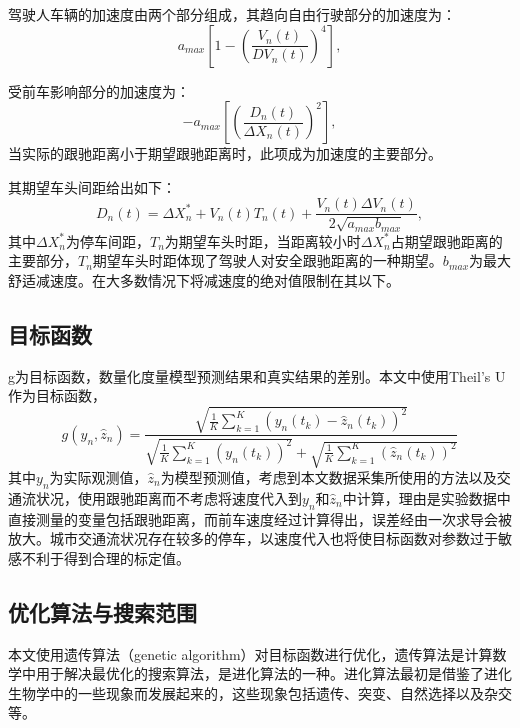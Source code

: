 %

驾驶人车辆的加速度由两个部分组成，其趋向自由行驶部分的加速度为：
\begin{equation}
a_{max}\left[1-\left(\frac{V_n(t)}{DV_n(t)}\right)^4\right],
\end{equation}

受前车影响部分的加速度为：
\begin{equation}
-a_{max}\left[\left(\frac{D_n(t)}{\Delta X_n(t)}\right )^2\right],
\end{equation}
当实际的跟驰距离小于期望跟驰距离时，此项成为加速度的主要部分。

其期望车头间距给出如下：
\begin{equation}
D_n(t)=\Delta X_n^*+V_n(t)T_n(t)+\frac{V_n(t)\Delta V_n(t)}{2\sqrt{a_{max}b_{max}}},
\end{equation}
其中$\Delta X_n^*$为停车间距，$T_n$为期望车头时距，当距离较小时$\Delta X_n^*$占期望跟驰距离的主要部分，$T_n$期望车头时距体现了驾驶人对安全跟驰距离的一种期望。$b_{max}$为最大舒适减速度。在大多数情况下将减速度的绝对值限制在其以下。






\subsection{目标函数}

g为目标函数，数量化度量模型预测结果和真实结果的差别。本文中使用Theil's U作为目标函数，
\begin{equation}
g(y_n,\hat{z}_n)=\frac{\sqrt{\frac{1}{K} \sum\limits_{k=1}^{K}(y_n(t_k)-\hat{z}_n(t_k))^2}}{\sqrt{\frac{1}{K} \sum\limits_{k=1}^{K}(y_n(t_k))^2}+\sqrt{\frac{1}{K} \sum\limits_{k=1}^{K}(\hat{z}_n(t_k))^2}}
\end{equation}
其中$y_n$为实际观测值，$\hat{z}_n$为模型预测值，考虑到本文数据采集所使用的方法以及交通流状况，使用跟驰距离而不考虑将速度代入到$y_n$和$\hat{z}_n$中计算，理由是实验数据中直接测量的变量包括跟驰距离，而前车速度经过计算得出，误差经由一次求导会被放大。城市交通流状况存在较多的停车，以速度代入也将使目标函数对参数过于敏感不利于得到合理的标定值。

\subsection{优化算法与搜索范围}
本文使用遗传算法（genetic algorithm）对目标函数进行优化，遗传算法是计算数学中用于解决最优化的搜索算法，是进化算法的一种。进化算法最初是借鉴了进化生物学中的一些现象而发展起来的，这些现象包括遗传、突变、自然选择以及杂交等。

